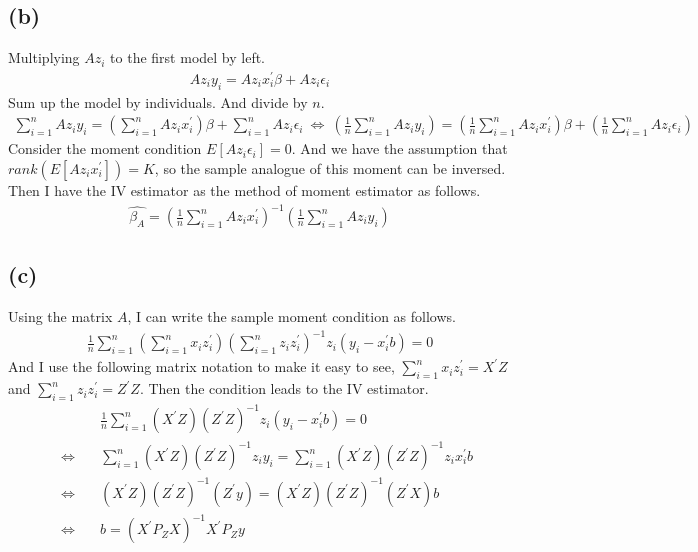 \documentclass{article}
\begin{document}
\subsection{(b)}
Multiplying $Az_i$ to the first model by left.
\begin{align*}
	Az_iy_i = Az_ix_i^{'}\beta + Az_i\epsilon_i
\end{align*}
Sum up the model by individuals. And divide by $n$.
\begin{align*}
	\sum_{i = 1}^n Az_iy_i = (\sum_{i = 1}^n Az_ix_i^{'})\beta + \sum_{i=1}^nAz_i\epsilon_i \ \Leftrightarrow\ \left(\frac{1}{n}\sum_{i = 1}^n Az_iy_i\right) = \left(\frac{1}{n}\sum_{i = 1}^n Az_ix_i^{'}\right)\beta + \left( \frac{1}{n}\sum_{i=1}^nAz_i\epsilon_i \right)
\end{align*}
Consider the moment condition $E[Az_i\epsilon_i] = 0$. And we have the assumption that $rank(E[Az_i x_i^{'}]) = K$, so the sample analogue of this moment can be inversed. Then I have the IV estimator as the method of moment estimator as follows.
\begin{align*}
	\hat{\beta_A} = \left(\frac{1}{n}\sum_{i = 1}^n Az_ix_i^{'}\right)^{-1} \left(\frac{1}{n}\sum_{i = 1}^n Az_iy_i\right)
\end{align*}

\subsection{(c)}
Using the matrix $A$, I can write the sample moment condition as follows.
\begin{align*}
	\frac{1}{n}\sum_{i = 1}^n \left(\sum_{i = 1}^n x_i z_i^{'}\right)\left(\sum_{i = 1}^n z_i z_i^{'}\right)^{-1} z_i (y_i - x_i^{'}b) = 0
\end{align*}
And I use the following matrix notation to make it easy to see, $\sum_{i = 1}^n x_i z_i^{'} = X^{'}Z$ and $\sum_{i = 1}^n z_i z_i^{'} = Z^{'}Z$. Then the condition leads to the IV estimator.
\begin{align*}
	&\frac{1}{n}\sum_{i = 1}^n \left(X^{'}Z\right)\left(Z^{'}Z\right)^{-1} z_i (y_i - x_i^{'}b) = 0\\[8pt]
	\quad \Leftrightarrow \quad&\sum_{i=1}^n \left(X^{'}Z\right)\left(Z^{'}Z\right)^{-1} z_i y_i = \sum_{i=1}^n \left(X^{'}Z\right)\left(Z^{'}Z\right)^{-1}z_i x_i^{'}b\\[8pt]
	\quad \Leftrightarrow \quad& \left(X^{'}Z\right)\left(Z^{'}Z\right)^{-1}\left(Z^{'}y\right) = \left(X^{'}Z\right)\left(Z^{'}Z\right)^{-1}\left(Z^{'}X\right)b\\[8pt]
	\quad \Leftrightarrow \quad&b = (X^{'}P_ZX)^{-1}X^{'}P_Z y
\end{align*}
\end{document}
